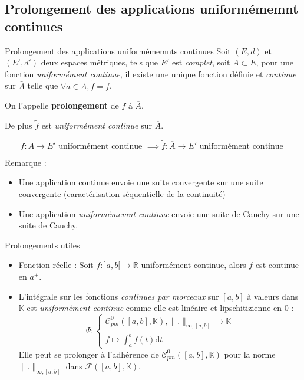 \subsection{Prolongement des applications uniformémemnt continues}

\begin{Prop}{Prolongement des applications uniformémemnts continues}{}
  Soit $(E, d)$ et $(E', d')$ deux espaces métriques, tels que $E'$ est \textit{complet}, soit $A \subset E$, pour une fonction \textit{uniformément continue}, il existe une unique fonction définie et \textit{continue} sur $\bar{A}$ telle que $\forall a \in A, \widetilde{f} = f$. 

  On l'appelle \textbf{prolongement} de $f$ à $\overline{A}$. 

  De plus $\widetilde{f}$ est \textit{uniformément continue} sur $\overline{A}$.
  
\[
  f: A \to E' \text{ uniformément continue } \implies \widetilde{f} : \overline{A} \to E' \text{ uniformément continue }
\]
\end{Prop}


Remarque : 
\begin{itemize}

    \item Une application continue envoie une suite convergente sur une suite convergente (caractérisation séquentielle de la continuité)

    \item Une application \textit{uniformémemnt continue} envoie une suite de Cauchy sur une suite de Cauchy.

\end{itemize}

\begin{Example}{Prolongements utiles}{}
\begin{itemize}

  \item Fonction réelle : Soit $f : ]a, b[ \to \mathbb{R}$ uniformément continue, alors $f$ est continue en $a ^{+}$. 
  \item L'intégrale sur les fonctions \textit{continues par morceaux} sur $[a, b]$ à valeurs dans $\mathbb{K}$ est \textit{uniformément continue} comme elle est linéaire et lipschitizienne en 0 : 
    \[
      \Psi : \begin{cases}
        \mathscr{C} ^{0}_{pm} ([a,b], \mathbb{K}), \| . \| _{\infty, [a,b]} \to \mathbb{K} \\ 
        f \mapsto \int_a ^{b} f(t) \mathrm{d} t
      \end{cases}
    \]
    Elle peut se prolonger à l'adhérence de $\mathscr{C} _{pm} ^{0} ([a,b], \mathbb{K})$ pour la norme $\| . \|_{\infty, [a,b]}$ dans $\mathcal{F}([a,b], \mathbb{K})$.

\end{itemize}
\end{Example}

